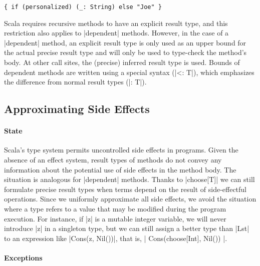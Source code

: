 \begin{lstlisting}
{ if (personalized) (_: String) else "Joe" }
\end{lstlisting}

Scala requires recursive methods to have an explicit result type, and this restriction also applies to |dependent| methods.
However, in the case of a |dependent| method, an explicit result type is only used as an upper bound for the actual precise result type and will only be used to type-check the method's body.
At other call sites, the (precise) inferred result type is used.
Bounds of dependent methods are written using a special syntax (|<: T|), which emphasizes the difference from normal result types (|: T|).

\subsection{Approximating Side Effects}

\paragraph{State}

Scala's type system permits uncontrolled side effects in programs.
Given the absence of an effect system, result types of methods do not convey any information about the potential use of side effects in the method body.
The situation is analogous for |dependent| methods.
Thanks to |choose[T]| we can still formulate precise result types when terms depend on the result of side-effectful operations.
Since we uniformly approximate all side effects, we avoid the situation where a type refers to a value that may be modified during the program execution.
For instance, if |z| is a mutable integer variable, we will never introduce |z| in a singleton type, but we can still assign a better type than |Lst| to an expression like |Cons(z, Nil())|, that is, |{ Cons(choose[Int], Nil()) }|.

\paragraph{Exceptions}

